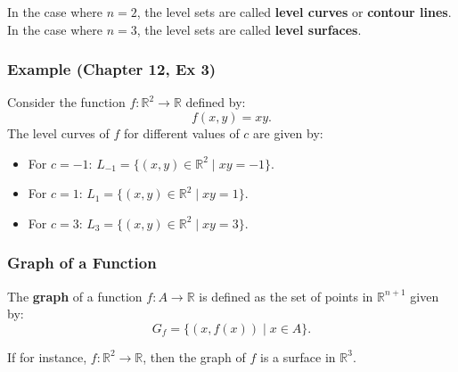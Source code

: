 \documentclass[11pt]{article}
\begin{document}
In the case where $n = 2$, the level sets are called \textbf{level curves} or \textbf{contour lines}. In the case where $n = 3$, the level sets are called \textbf{level surfaces}.

\subsubsection*{Example (Chapter 12, Ex 3)}
Consider the function $f : \mathbb{R}^2 \to \mathbb{R}$ defined by:
\[ f(x, y) = xy. \]
The level curves of $f$ for different values of $c$ are given by:
\begin{itemize}
    \item For $c = -1$: $L_{-1} = \{ (x, y) \in \mathbb{R}^2 \mid xy = -1 \}$.
    \item For $c = 1$: $L_1 = \{ (x, y) \in \mathbb{R}^2 \mid xy = 1 \}$.
    \item For $c = 3$: $L_3 = \{ (x, y) \in \mathbb{R}^2 \mid xy = 3 \}$.
\end{itemize}

\subsubsection{Graph of a Function}
The \textbf{graph} of a function $f : A \to \mathbb{R}$ is defined as the set of points in $\mathbb{R}^{n+1}$ given by:
\[ G_f = \{ (x, f(x)) \mid x \in A \}. \]

If for instance, $f : \mathbb{R}^2 \to \mathbb{R}$, then the graph of $f$ is a surface in $\mathbb{R}^3$.
\begin{center}
\hspace{1cm}
\end{center}
\end{document}
